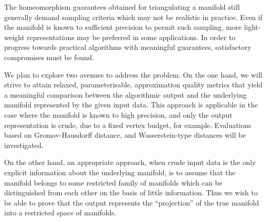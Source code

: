 The homeomorphism guarantees obtained for triangulating a manifold
still generally demand sampling criteria which may not be realistic in 
practice. Even if the manifold is known to sufficient precision to
permit such sampling, more light-weight representations may be
preferred in some applications.  In order to progress towards
practical algorithms with meaningful guarantees, satisfactory
compromises must be found.
%
%

We plan to explore two avenues to address the problem. On the one
hand, we will strive to attain relaxed, parameterisable, approximation
quality metrics that yield a meaningful comparison between the
algorithmic output and the underlying manifold represented by the
given input data. This approach is applicable in the case where the
manifold is known to high precision, and only the output
representation is crude, due to a fixed vertex budget, for
example. Evaluations based on Gromov-Hausdorff distance,
and Wasserstein-type distances will be investigated.

On the other hand, an appropriate approach, when crude input
data is the only explicit information about the underlying manifold,
is to assume that the manifold belongs to some restricted family of
manifolds which can be distinguished from each other on the basis of
little information. Thus we wish to be able to prove that the output
represents the ``projection'' of the true manifold into a restricted
space of manifolds.

